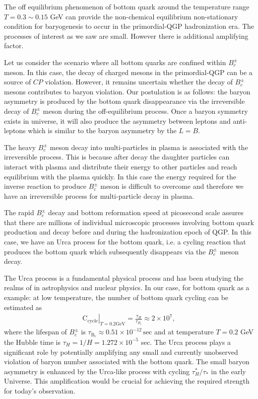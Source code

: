 

The off equilibrium phenomenon of bottom quark around the temperature range $T=0.3\sim0.15$ GeV can provide the non-chemical equilibrium non-stationary condition for baryogenesis to occur in the primordial-QGP hadronization era. The processes of interest as we saw are small. However there is additional amplifying factor. 
 
 Let us consider the scenario where all bottom quarks are confined within $B_c^\pm$ meson. In this case, the decay of charged mesons in the primordial-QGP can be a source of $CP$ violation. However, it remains uncertain whether the decay of $B_c^\pm$ mesons contributes to baryon violation. Our postulation is as follows: the baryon asymmetry is produced by the bottom quark disappearance via the irreversible decay of $B^\pm_c$ meson during the off-equilibrium process. Once a baryon symmetry exists in universe, it will also produce the asymmetry between leptons and anti-leptons which is similar to the baryon asymmetry by the $L=B$.

The heavy $B_c^\pm$ meson decay into multi-particles in plasma is associated with the irreversible process. This is because after decay the daughter particles can interact with plasma and distribute their energy to other particles and reach equilibrium with the plasma quickly. In this case the  energy required for the inverse reaction to produce $B_c^\pm$ meson is difficult to overcome and therefore we have an irreversible process for multi-particle decay in plasma.


The rapid $B_c^\pm$ decay and bottom reformation speed at picosecond scale assures that there are millions of individual microscopic processes involving bottom quark production and decay before and during the hadronization epoch of QGP. In this case, we have an Urca process for the bottom quark, i.e. a cycling reaction that produces the bottom quark which subsequently  disappears via the $B_c^\pm$ meson decay. 

The Urca process is a fundamental physical process  and has been studying the realms of in astrophysics and nuclear physics. In our case, for bottom quark as a example: at low temperature, the number of bottom quark cycling can be estimated as
\begin{align}
\left.\mathrm{C_{cycle}}\right|_{T=0.2\mathrm{GeV}}=\frac{\tau_H}{\tau_{B_c}}\approx2\times10^7,
\end{align}
where the lifespan of $B_c^\pm$ is  $\tau_{\mathrm{B}_c}\approx0.51\times10^{-12}\,\mathrm{sec}$ and at temperature $T=0.2$ GeV the Hubble time is $\tau_H=1/H=1.272\times10^{-5}$ sec. The Urca process plays a significant role by potentially amplifying any small and currently unobserved violation of baryon number associated with the bottom quark. The small baryon asymmetry is enhanced by the Urca-like process with cycling ${\tau^\ast_H}/{\tau_\ast}$ in the early Universe.
This amplification would be crucial for achieving the required strength for today's observation. 

